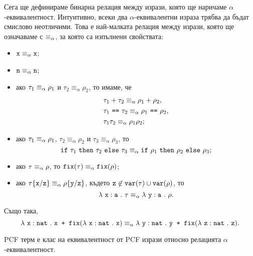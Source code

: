 Сега ще дефинираме бинарна релация между изрази, която ще наричаме $\alpha$-ек\-ви\-ва\-лент\-ност.
Интуитивно, всеки два $\alpha$-еквивалентни израза трябва да бъдат смислово неотличими.
Това е най-малката релация между изрази, която ще означаваме с $\equiv_{\alpha}$, за която са изпълнени свойствата:
\begin{itemize}
\item
  $\texttt{x} \equiv_{\alpha} \texttt{x}$;
\item
  $\texttt{n} \equiv_{\alpha} \texttt{n}$;
\item
  ако $\tau_1 \equiv_{\alpha} \rho_1$ и $\tau_2 \equiv_\alpha \rho_2$, то имаме, че
  \begin{align*}
    & \tau_1 + \tau_2 \equiv_{\alpha} \rho_1 + \rho_2,\\
    & \tau_1\ \texttt{==}\ \tau_2 \equiv_{\alpha} \rho_1\ \texttt{==}\ \rho_2,\\
    & \tau_1 \tau_2 \equiv_{\alpha} \rho_1 \rho_2;
  \end{align*}
\item
  ако $\tau_1 \equiv_{\alpha} \rho_1$, $\tau_2 \equiv_\alpha \rho_2$ и $\tau_3 \equiv_\alpha \rho_3$, то
  \[\texttt{if}\ \tau_1\ \texttt{then}\ \tau_2\ \texttt{else}\ \tau_3 \equiv_{\alpha} \texttt{if}\ \rho_1\ \texttt{then}\ \rho_2\ \texttt{else}\ \rho_3;\]
\item
  ако $\tau \equiv_{\alpha} \rho$, то $\texttt{fix}(\tau) \equiv_\alpha \texttt{fix}(\rho)$;
\item  
  ако $\tau\{\texttt{x}/{\texttt{z}}\} \equiv_{\alpha} \rho\{\texttt{y}/{\texttt{z}}\}$, където $\texttt{z} \not\in \texttt{var}(\tau) \cup \texttt{var}(\rho)$, то
  \[\lambda~\texttt{x}:\texttt{a}~.~{\tau} \equiv_{\alpha} \lambda~\texttt{y}:\texttt{a}~.~{\rho}.\]
\end{itemize}

Също така,
\[\lambda~\texttt{x}:\texttt{nat}~.~{\texttt{x + }\texttt{fix}(\lambda~\texttt{x}:\texttt{nat}~.~{\texttt{x}})} \equiv_{\alpha} \lambda~\texttt{y}:\texttt{nat}~.~{\texttt{y + }\texttt{fix}(\lambda~\texttt{z}:\texttt{nat}~.~{\texttt{z}})}.\]

\begin{framed}
\begin{definition}
  PCF терм е клас на еквивалентност от PCF изрази относно релацията $\alpha$-еквивалентност.
\end{definition}
\end{framed}

